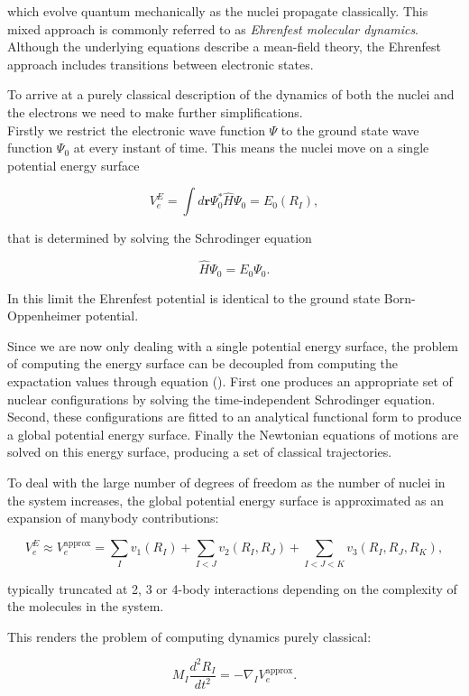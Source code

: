 which evolve quantum mechanically as the nuclei propagate
classically.
This mixed approach is commonly referred to as
\textit{Ehrenfest molecular dynamics}.
Although the underlying equations describe a mean-field
theory, the Ehrenfest approach includes transitions
between electronic states.
\par
To arrive at a purely classical description of the
dynamics of both the nuclei and the electrons
we need to make further simplifications. \\
Firstly we restrict the electronic wave function $\Psi$
to the ground state wave function $\Psi_0$
at every instant of time.
This means the nuclei move on a single potential energy surface

$$ V_e^E = \int d\bm{r} \Psi_0^* \hat{H} \Psi_0 = E_0(R_I) , $$

that is determined by solving the Schrodinger equation

$$ \hat{H} \Psi_0 = E_0 \Psi_0 . $$

In this limit the Ehrenfest potential is identical
to the ground state Born-Oppenheimer potential.
\par
Since we are now only dealing with a single potential
energy surface, the problem of computing the energy surface
can be decoupled from computing the expactation values
through equation ().
First one produces an appropriate set of nuclear configurations
by solving the time-independent Schrodinger equation.
Second, these configurations are fitted to an analytical
functional form to produce a global potential energy surface.
Finally the Newtonian equations of motions are solved
on this energy surface, producing a set of classical
trajectories.
\par
To deal with the large number of degrees of freedom
as the number of nuclei in the system increases,
the global potential energy surface
is approximated as an expansion of manybody contributions:

$$ V_e^E \approx V_e^{\text{approx}} =
    \sum_I v_1(R_I) + \sum_{I < J} v_2(R_I, R_J)
    + \sum_{I < J < K} v_3(R_I, R_J, R_K) , $$

typically truncated at 2, 3 or 4-body interactions
depending on the complexity of the molecules in the system.
\par
This renders the problem of computing dynamics purely classical:

$$ M_I \frac{d^2 R_I}{dt^2} = -\nabla_I V_e^{\text{approx}} . $$

